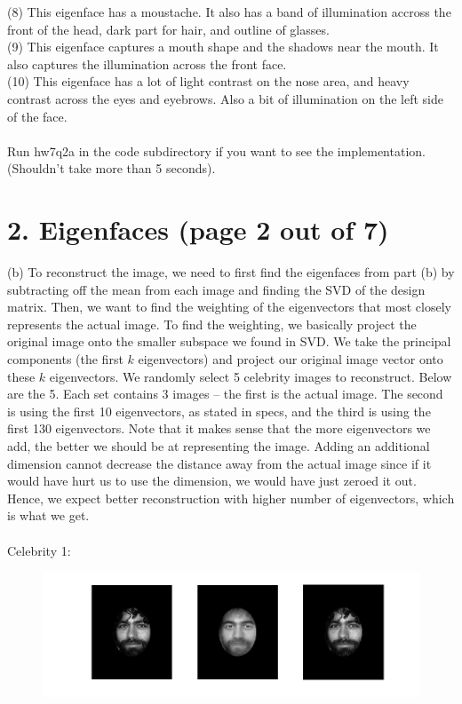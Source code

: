 \documentclass[11pt]{article}
\begin{document}
(8) This eigenface has a moustache. It also has a band of illumination accross the front of the head, dark part for hair, and outline of glasses. \\
(9) This eigenface captures a mouth shape and the shadows near the mouth. It also captures the illumination across the front face. \\
(10) This eigenface has a lot of light contrast on the nose area, and heavy contrast across the eyes and eyebrows. Also a bit of illumination on the left side of the face.
\\\\
Run hw7q2a in the code subdirectory if you want to see the implementation. (Shouldn't take more than 5 seconds).
\newpage

\section*{2. Eigenfaces (page 2 out of 7)}
(b) To reconstruct the image, we need to first find the eigenfaces from part (b) by subtracting off the mean from each image and finding the SVD of the design matrix. Then, we want to find the weighting of the eigenvectors that most closely represents the actual image. To find the weighting, we basically project the original image onto the smaller subspace we found in SVD. We take the principal components (the first $k$ eigenvectors) and project our original image vector onto these $k$ eigenvectors. We randomly select 5 celebrity images to reconstruct. Below are the 5. Each set contains 3 images -- the first is the actual image. The second is using the first 10 eigenvectors, as stated in specs, and the third is using the first 130 eigenvectors. Note that it makes sense that the more eigenvectors we add, the better we should be at representing the image. Adding an additional dimension cannot decrease the distance away from the actual image since if it would have hurt us to use the dimension, we would have just zeroed it out. Hence, we expect better reconstruction with higher number of eigenvectors, which is what we get. \\\\
Celebrity 1:
\begin{figure}[ht!]
\centering
\includegraphics[width=180mm]{images/celeb1.png}
\label{overflow}
\end{figure} \\
\end{document}
